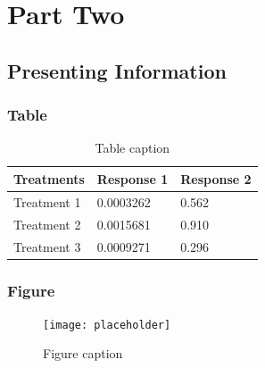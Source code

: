 \documentclass[12pt,fleqn,a4paper]{book} %
\begin{document}
    \part{Part Two}
    
    
    
    \chapter{Presenting Information}
    
    \section{Table}
    
    \begin{table}[h]
    \centering
    \begin{tabular}{l l l}
    \toprule
    \textbf{Treatments} & \textbf{Response 1} & \textbf{Response 2}\\
    \midrule
    Treatment 1 & 0.0003262 & 0.562 \\
    Treatment 2 & 0.0015681 & 0.910 \\
    Treatment 3 & 0.0009271 & 0.296 \\
    \bottomrule
    \end{tabular}
    \caption{Table caption}
    \end{table}
    
    
    \section{Figure}
    
    \begin{figure}[h]
    \centering\texttt{[image: placeholder]}
    \caption{Figure caption}
    \end{figure}
    
    
\end{document}

